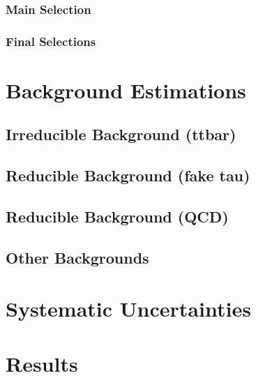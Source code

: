 \subsubsection{Main Selection}

\subsubsection{Final Selections}

\section{Background Estimations}

\subsection{Irreducible Background (ttbar)}

\subsection{Reducible Background (fake tau)}

\subsection{Reducible Background (QCD)}

\subsection{Other Backgrounds}

\section{Systematic Uncertainties}

\section{Results}